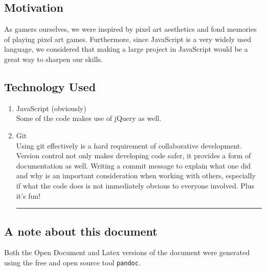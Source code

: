 \documentclass[11pt]{article}
\begin{document}
\subsection{Motivation}
\label{sec:org7a0e770}
As gamers ourselves, we were inspired by pixel art aesthetics and fond memories of playing pixel art games. Furthermore, since JavaScript is a very widely used language, we considered that making a large project in JavaScript would be a great way to sharpen our skills.\\
\subsection{Technology Used}
\label{sec:org75e755b}
\begin{enumerate}
\item JavaScript (obviously)\\
Some of the code makes use of jQuery as well.\\
\item Git\\
Using git effectively is a hard requirement of collaborative development. Version control not only makes developing code safer, it provides a form of documentation as well. Writing a commit message to explain what one did and why is an important consideration when working with others, especially if what the code does is not immediately obvious to everyone involved. Plus it's fun!\\

\noindent\rule{\textwidth}{0.5pt}
\end{enumerate}

\subsection{A note about this document}
\label{sec:org9a98b98}
Both the Open Document and Latex versions of the document were generated using the free and open source tool \texttt{pandoc}.\\
\end{document}
